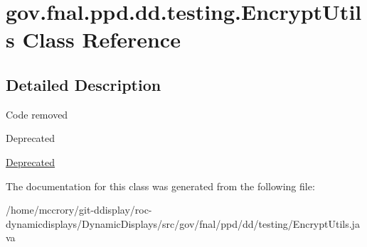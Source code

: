 \hypertarget{classgov_1_1fnal_1_1ppd_1_1dd_1_1testing_1_1EncryptUtils}{\section{gov.\-fnal.\-ppd.\-dd.\-testing.\-Encrypt\-Utils Class Reference}
\label{classgov_1_1fnal_1_1ppd_1_1dd_1_1testing_1_1EncryptUtils}
}


\subsection{Detailed Description}
Code removed \begin{DoxyRefDesc}{Deprecated}
\item[\hyperlink{deprecated__deprecated000006}{Deprecated}]\end{DoxyRefDesc}


The documentation for this class was generated from the following file\-:\begin{DoxyCompactItemize}
\item 
/home/mccrory/git-\/ddisplay/roc-\/dynamicdisplays/\-Dynamic\-Displays/src/gov/fnal/ppd/dd/testing/Encrypt\-Utils.\-java\end{DoxyCompactItemize}
